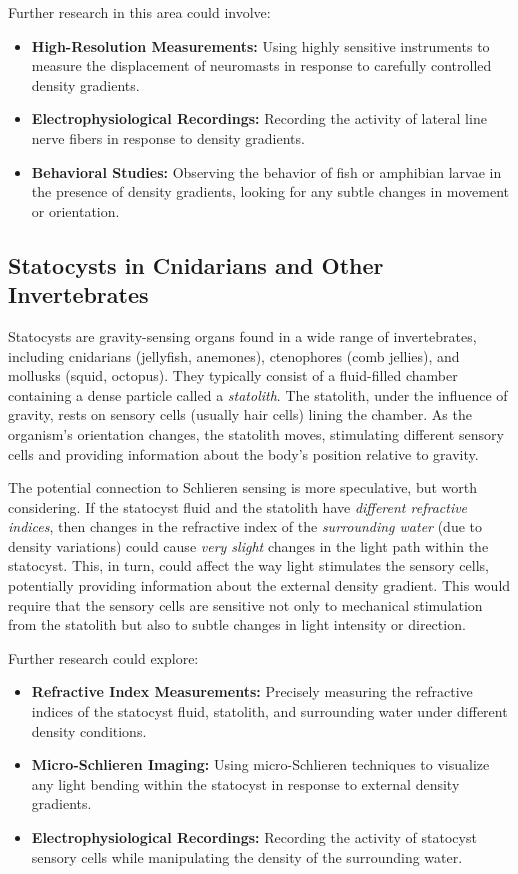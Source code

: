 \documentclass[11pt]{article}
\begin{document}
Further research in this area could involve:
\begin{itemize}
    \item \textbf{High-Resolution Measurements:} Using highly sensitive instruments to measure the displacement of neuromasts in response to carefully controlled density gradients.
    \item \textbf{Electrophysiological Recordings:} Recording the activity of lateral line nerve fibers in response to density gradients.
    \item \textbf{Behavioral Studies:} Observing the behavior of fish or amphibian larvae in the presence of density gradients, looking for any subtle changes in movement or orientation.
\end{itemize}

\subsection{Statocysts in Cnidarians and Other Invertebrates}

Statocysts \cite{Budelmann1992InvertebrateHearing} are gravity-sensing organs found in a wide range of invertebrates, including cnidarians (jellyfish, anemones), ctenophores (comb jellies), and mollusks (squid, octopus). They typically consist of a fluid-filled chamber containing a dense particle called a \textit{statolith}. The statolith, under the influence of gravity, rests on sensory cells (usually hair cells) lining the chamber. As the organism's orientation changes, the statolith moves, stimulating different sensory cells and providing information about the body's position relative to gravity.

The potential connection to Schlieren sensing is more speculative, but worth considering. If the statocyst fluid and the statolith have \textit{different refractive indices}, then changes in the refractive index of the \textit{surrounding water} (due to density variations) could cause \textit{very slight} changes in the light path within the statocyst. This, in turn, could affect the way light stimulates the sensory cells, potentially providing information about the external density gradient. This would require that the sensory cells are sensitive not only to mechanical stimulation from the statolith but also to subtle changes in light intensity or direction.

Further research could explore:
\begin{itemize}
    \item \textbf{Refractive Index Measurements:} Precisely measuring the refractive indices of the statocyst fluid, statolith, and surrounding water under different density conditions.
    \item \textbf{Micro-Schlieren Imaging:} Using micro-Schlieren techniques \cite{Settles2001Schlieren} to visualize any light bending within the statocyst in response to external density gradients.
    \item \textbf{Electrophysiological Recordings:} Recording the activity of statocyst sensory cells while manipulating the density of the surrounding water.
\end{itemize}
\end{document}
